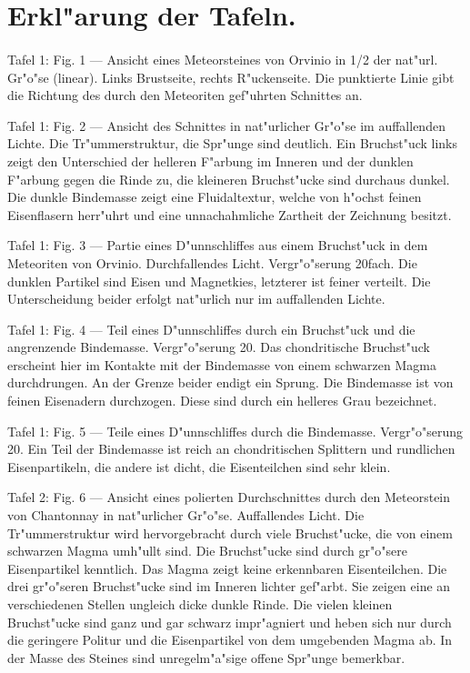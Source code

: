 \documentclass[a4paper, 11pt, oneside]{article}
\begin{document}
\section{Erkl"arung der Tafeln.}
\paragraph{}
Tafel 1: Fig. 1 --- Ansicht eines Meteorsteines von Orvinio in 1/2 der nat"url. Gr"o"se (linear). Links Brustseite, rechts R"uckenseite. Die punktierte Linie gibt die Richtung des durch den Meteoriten gef"uhrten Schnittes an.

Tafel 1: Fig. 2 --- Ansicht des Schnittes in nat"urlicher Gr"o"se im auffallenden Lichte. Die Tr"ummerstruktur, die Spr"unge sind deutlich. Ein Bruchst"uck links zeigt den Unterschied der helleren F"arbung im Inneren und der dunklen F"arbung gegen die Rinde zu, die kleineren Bruchst"ucke sind durchaus dunkel. Die dunkle Bindemasse zeigt eine Fluidaltextur, welche von h"ochst feinen Eisenflasern herr"uhrt und eine unnachahmliche Zartheit der Zeichnung besitzt.

Tafel 1: Fig. 3 --- Partie eines D"unnschliffes aus einem Bruchst"uck in dem Meteoriten von Orvinio. Durchfallendes Licht. Vergr"o"serung 20fach. Die dunklen Partikel sind Eisen und Magnetkies, letzterer ist feiner verteilt. Die Unterscheidung beider erfolgt nat"urlich nur im auffallenden Lichte.

Tafel 1: Fig. 4 --- Teil eines D"unnschliffes durch ein Bruchst"uck und die angrenzende Bindemasse. Vergr"o"serung 20. Das chondritische Bruchst"uck erscheint hier im Kontakte mit der Bindemasse von einem schwarzen Magma durchdrungen. An der Grenze beider endigt ein Sprung. Die Bindemasse ist von feinen Eisenadern durchzogen. Diese sind durch ein helleres Grau bezeichnet.

Tafel 1: Fig. 5 --- Teile eines D"unnschliffes durch die Bindemasse. Vergr"o"serung 20. Ein Teil der Bindemasse ist reich an chondritischen Splittern und rundlichen Eisenpartikeln, die andere ist dicht, die Eisenteilchen sind sehr klein.

Tafel 2: Fig. 6 --- Ansicht eines polierten Durchschnittes durch den Meteorstein von Chantonnay in nat"urlicher Gr"o"se. Auffallendes Licht. Die Tr"ummerstruktur wird hervorgebracht durch viele Bruchst"ucke, die von einem schwarzen Magma umh"ullt sind. Die Bruchst"ucke sind durch gr"o"sere Eisenpartikel kenntlich. Das Magma zeigt keine erkennbaren Eisenteilchen. Die drei gr"o"seren Bruchst"ucke sind im Inneren lichter gef"arbt. Sie zeigen eine an verschiedenen Stellen ungleich dicke dunkle Rinde. Die vielen kleinen Bruchst"ucke sind ganz und gar schwarz impr"agniert und heben sich nur durch die geringere Politur und die Eisenpartikel von dem umgebenden Magma ab. In der Masse des Steines sind unregelm"a"sige offene Spr"unge bemerkbar.
\end{document}

